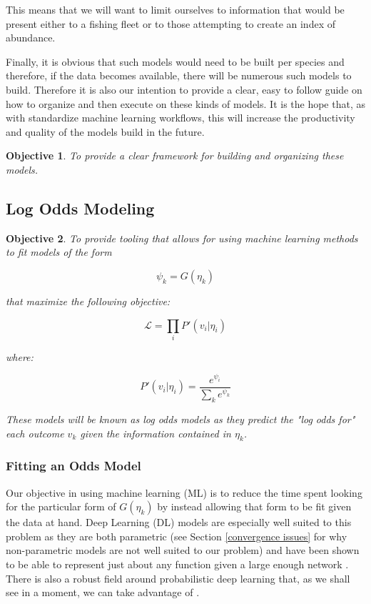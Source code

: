 \documentclass[11pt]{article}
\newtheorem{objective}{Objective}
\begin{document}
This means that we will want to limit ourselves to information that would be present either to a fishing fleet or to those attempting to create an index of abundance. \newline

Finally, it is obvious that such models would need to be built per species and therefore, if the data becomes available, there will be numerous such models to build. Therefore it is also our intention to provide a clear, easy to follow guide on how to organize and then execute on these kinds of models. It is the hope that, as with standardize machine learning workflows, this will increase the productivity and quality of the models build in the future. 

\begin{objective}
To provide a clear framework for building and organizing these models. 
\end{objective}

\subsection{Log Odds Modeling}

\begin{objective}
To provide tooling that allows for using machine learning methods to fit models of the form

$$\psi_k = G(\eta_k)$$

that maximize the following objective:


$$\mathcal{L}=\prod_i P'(v_i | \eta_i)$$

where:

$$P'(v_i|\eta_i) = \frac{e^{\psi_i}}{\sum_k e^{\psi_k}}$$

These models will be known as log odds models as they predict the "log odds for" each outcome $v_k$ given the information contained in $\eta_k$. 

\end{objective}

\subsubsection{Fitting an Odds Model}

Our objective in using machine learning (ML) is to reduce the time spent looking for the particular form of $G(\eta_k)$ by instead allowing that form to be fit given the data at hand. Deep Learning (DL) models are especially well suited to this problem as they are both parametric (see Section \ref{convergence issues} for why non-parametric models are not well suited to our problem) and have been shown to be able to represent just about any function given a large enough network \cite{LiquetMokaNazarathy2024DeepLearning}. There is also a robust field around probabilistic deep learning that, as we shall see in a moment, we can take advantage of \cite{durr}.
\newline
\end{document}
